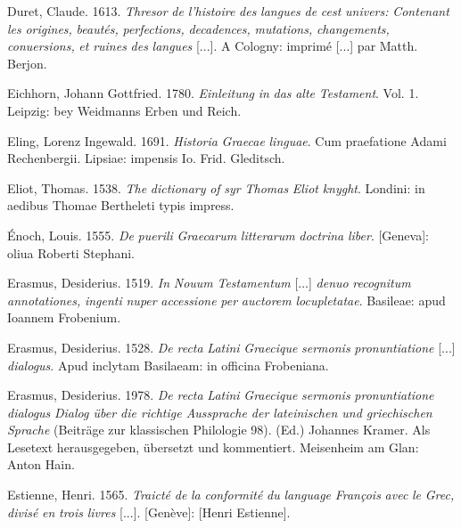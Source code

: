 Duret, Claude. 1613. \textit{Thresor} \textit{de} \textit{l’histoire} \textit{des} \textit{langues} \textit{de} \textit{cest} \textit{univers:} \textit{Contenant} \textit{les} \textit{origines,} \textit{beautés,} \textit{perfections,} \textit{decadences,} \textit{mutations,} \textit{changements,} \textit{conuersions,} \textit{et} \textit{ruines} \textit{des} \textit{langues} [...]. A Cologny: imprimé [...] par Matth. Berjon.

Eichhorn, Johann Gottfried. 1780. \textit{Einleitung} \textit{in} \textit{das} \textit{alte} \textit{Testament}. Vol. 1. Leipzig: bey Weidmanns Erben und Reich.

Eling, Lorenz Ingewald. 1691. \textit{Historia} \textit{Graecae} \textit{linguae}. Cum praefatione Adami Rechenbergii. Lipsiae: impensis Io. Frid. Gleditsch.

Eliot, Thomas. 1538. \textit{The} \textit{dictionary} \textit{of} \textit{syr} \textit{Thomas} \textit{Eliot} \textit{knyght}. Londini: in aedibus Thomae Bertheleti typis impress.

Énoch, Louis. 1555. \textit{De} \textit{puerili} \textit{Graecarum} \textit{litterarum} \textit{doctrina} \textit{liber}. [Geneva]: oliua Roberti Stephani.

Erasmus, Desiderius. 1519. \textit{In} \textit{Nouum} \textit{Testamentum} [...] \textit{denuo} \textit{recognitum} \textit{annotationes,} \textit{ingenti} \textit{nuper} \textit{accessione} \textit{per} \textit{auctorem} \textit{locupletatae}. Basileae: apud Ioannem Frobenium.

Erasmus, Desiderius. 1528. \textit{De} \textit{recta} \textit{Latini} \textit{Graecique} \textit{sermonis} \textit{pronuntiatione} [...] \textit{dialogus}. Apud inclytam Basilaeam: in officina Frobeniana.

Erasmus, Desiderius. 1978. \textit{De} \textit{recta} \textit{Latini} \textit{Graecique} \textit{sermonis} \textit{pronuntiatione} \textit{dialogus} \textit{{\textbar} Dialog über die richtige Aussprache der lateinischen und griechischen Sprache} (Beiträge zur klassischen Philologie 98). (Ed.) Johannes Kramer. Als Lesetext herausgegeben, übersetzt und kommentiert. Meisenheim am Glan: Anton Hain.

Estienne, Henri. 1565. \textit{Traicté} \textit{de} \textit{la} \textit{conformité} \textit{du} \textit{language} \textit{François} \textit{avec} \textit{le} \textit{Grec,} \textit{divisé} \textit{en} \textit{trois} \textit{livres} [...]. [Genève]: [Henri Estienne].

